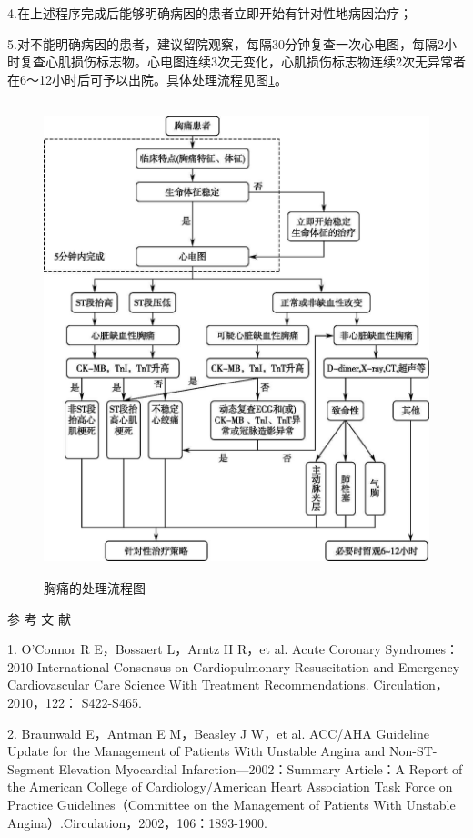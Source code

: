 4.在上述程序完成后能够明确病因的患者立即开始有针对性地病因治疗；

5.对不能明确病因的患者，建议留院观察，每隔30分钟复查一次心电图，每隔2小时复查心肌损伤标志物。心电图连续3次无变化，心肌损伤标志物连续2次无异常者在6～12小时后可予以出院。具体处理流程见图\ref{fig8-1}。

\begin{figure}[!htbp]
 \centering
 \includegraphics[width=4.69792in,height=5.41667in]{./images/Image00044.jpg}
 \captionsetup{justification=centering}
 \caption{胸痛的处理流程图}
 \label{fig8-1}
  \end{figure} 

\hypertarget{text00023.htmlux5cux23CHP1-8-4}{}
参 考 文 献

1. O'Connor R E，Bossaert L，Arntz H R，et al. Acute Coronary
Syndromes：2010 International Consensus on Cardiopulmonary Resuscitation
and Emergency Cardiovascular Care Science With Treatment
Recommendations. Circulation，2010，122： S422-S465.

2. Braunwald E，Antman E M，Beasley J W，et al. ACC/AHA Guideline Update
for the Management of Patients With Unstable Angina and Non-ST-Segment
Elevation Myocardial Infarction---2002：Summary Article：A Report of the
American College of Cardiology/American Heart Association Task Force on
Practice Guidelines（Committee on the Management of Patients With
Unstable Angina）.Circulation，2002，106：1893-1900.

